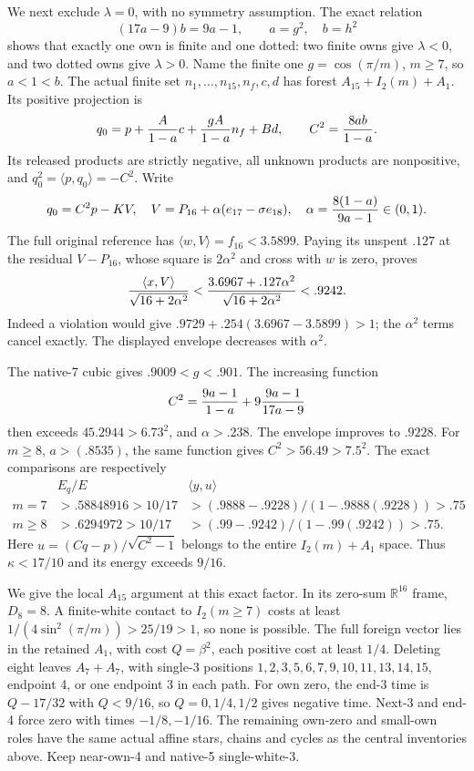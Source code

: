 \documentclass[11pt]{article}
\theoremstyle{definition}
\theoremstyle{remark}
\newcommand{\ip}[2]{\langle #1,#2\rangle}
\begin{document}
We next exclude \(\lambda=0\), with no symmetry assumption.
The exact relation
\[
 (17a-9)b=9a-1,\qquad a=g^2,\quad b=h^2
\]
shows that exactly one own is finite and one dotted: two finite
owns give \(\lambda<0\), and two dotted owns give \(\lambda>0\).
Name the finite one \(g=\cos(\pi/m)\), \(m\ge7\), so \(a<1<b\).
The actual finite set \(n_1,\ldots,n_{15},n_f,c,d\) has
forest \(A_{15}+I_2(m)+A_1\).
Its positive projection is
\[
 q_0=p+{A\over1-a}c+{gA\over1-a}n_f+Bd,\qquad
 C^2={8ab\over1-a}.
\]
Its released products are strictly negative, all unknown products
are nonpositive, and \(q_0^2=\ip p{q_0}=-C^2\).
Write
\[
 q_0=C^2p-KV,\quad V=P_{16}+\alpha(e_{17}-\sigma e_{18}),
 \quad \alpha={8(1-a)\over9a-1}\in(0,1).
\]
The full original reference has
\(\ip wV=f_{16}<3.5899\).
Paying its unspent \(.127\) at the residual \(V-P_{16}\),
whose square is \(2\alpha^2\) and cross with \(w\) is zero,
proves
\[
 {\ip xV\over\sqrt{16+2\alpha^2}}
 <{3.6967+.127\alpha^2\over\sqrt{16+2\alpha^2}}<.9242.
\]
Indeed a violation would give
\(.9729+.254(3.6967-3.5899)>1\);
the \(\alpha^2\) terms cancel exactly.
The displayed envelope decreases with \(\alpha^2\).

The native-7 cubic gives \(.9009<g<.901\).
The increasing function
\[
 C^2={9a-1\over1-a}
          +9{9a-1\over17a-9}
\]
then exceeds \(45.2944>6.73^2\), and \(\alpha>.238\).
The envelope improves to \(.9228\).
For \(m\ge8\), \(a>(.8535)\), the same function gives
\(C^2>56.49>7.5^2\).
The exact comparisons are respectively
\[
 \begin{array}{c|c|c}
 &E_q/E&\ip yu\\ \hline
 m=7&>.58848916>10/17&
       >(.9888-.9228)/(1-.9888(.9228))>.75\\
 m\ge8&>.6294972>10/17&
       >(.99-.9242)/(1-.99(.9242))>.75 .
 \end{array}
\]
Here \(u=(Cq-p)/\sqrt{C^2-1}\) belongs to the entire
\(I_2(m)+A_1\) space.  Thus \(\kappa<17/10\) and
its energy exceeds \(9/16\).

We give the local \(A_{15}\) argument at this exact factor.
In its zero-sum \(\mathbb R^{16}\) frame, \(D_8=8\).
A finite-white contact to \(I_2(m\ge7)\) costs at least
\(1/(4\sin^2(\pi/m))>25/19>1\), so none is possible.
The full foreign vector lies in the retained \(A_1\), with cost
\(Q=\beta^2\), each positive cost at least \(1/4\).
Deleting eight leaves \(A_7+A_7\), with single-3 positions
\(1,2,3,5,6,7,9,10,11,13,14,15\), endpoint 4,
or one endpoint 3 in each path.
For own zero, the end-3 time is \(Q-17/32\) with
\(Q<9/16\), so \(Q=0,1/4,1/2\) gives negative time.
Next-3 and end-4 force zero with times \(-1/8,-1/16\).
The remaining own-zero and small-own roles have the same actual
affine stars, chains and cycles as the central inventories above.
Keep near-own-4 and native-5 single-white-3.
\end{document}
